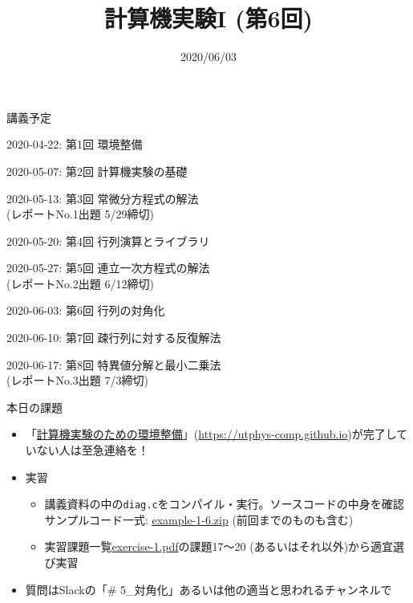 \documentclass[10pt,dvipdfmx]{beamer}
\title{計算機実験I (第6回)}
\date{2020/06/03}
\begin{document}
\begin{frame}
  \titlepage
  \tableofcontents
\end{frame}

\begin{frame}[t]{講義予定}
  \begin{itemize}
  {\color{gray} \item 2020-04-22: 第1回 環境整備}
  {\color{gray} \item 2020-05-07: 第2回 計算機実験の基礎}
  {\color{gray} \item 2020-05-13: 第3回 常微分方程式の解法 \\
    \hspace*{5em} (レポートNo.1出題 5/29締切)}
  {\color{gray} \item 2020-05-20: 第4回 行列演算とライブラリ}
  {\color{gray} \item 2020-05-27: 第5回 連立一次方程式の解法 \\
  \hspace*{5em} (レポートNo.2出題 6/12締切)}
\item 2020-06-03: 第6回 行列の対角化
\item 2020-06-10: 第7回 疎行列に対する反復解法
\item 2020-06-17: 第8回 特異値分解と最小二乗法 \\
  \hspace*{5em} (レポートNo.3出題 7/3締切)
  \end{itemize}
\end{frame}

\begin{frame}[t]{本日の課題}
  \begin{itemize}
  \item 「\href{https://utphys-comp.github.io}{計算機実験のための環境整備}」({\small \href{https://utphys-comp.github.io}{https://utphys-comp.github.io}})が完了していない人は至急連絡を！
  \item 実習
    \begin{itemize}
    \item 講義資料の中の{\tt diag.c}をコンパイル・実行。ソースコードの中身を確認 \\
      サンプルコード一式: \href{https://github.com/todo-group/ComputerExperiments/releases/tag/2020s-computer1}{example-1-6.zip} (前回までのものも含む)
    \item 実習課題一覧\href{https://github.com/todo-group/ComputerExperiments/releases/tag/2020s-computer1}{exercise-1.pdf}の課題17〜20 (あるいはそれ以外)から適宜選び実習
    \end{itemize}
  \item 質問はSlackの「\# 5\_対角化」あるいは他の適当と思われるチャンネルで \\[2em]
  \end{itemize}
\end{frame}
\end{document}
